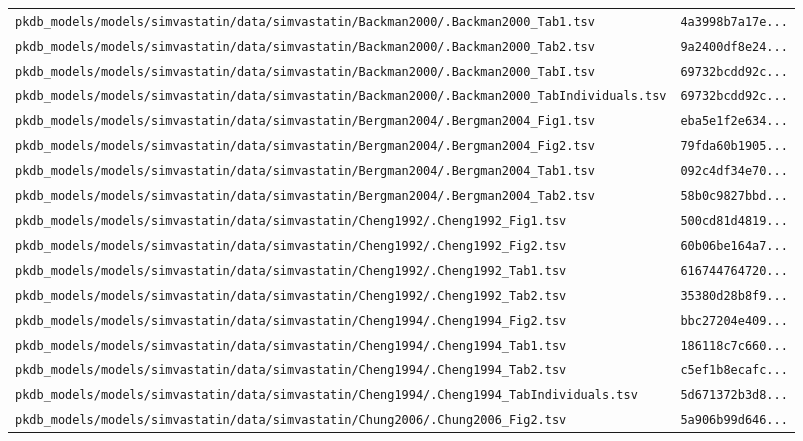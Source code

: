 \begin{longtable}{ll}
\texttt{pkdb\_models/models/simvastatin/data/simvastatin/Backman2000/.Backman2000\_Tab1.tsv} & \texttt{4a3998b7a17e...} \\
\texttt{pkdb\_models/models/simvastatin/data/simvastatin/Backman2000/.Backman2000\_Tab2.tsv} & \texttt{9a2400df8e24...} \\
\texttt{pkdb\_models/models/simvastatin/data/simvastatin/Backman2000/.Backman2000\_TabI.tsv} & \texttt{69732bcdd92c...} \\
\texttt{pkdb\_models/models/simvastatin/data/simvastatin/Backman2000/.Backman2000\_TabIndividuals.tsv} & \texttt{69732bcdd92c...} \\
\texttt{pkdb\_models/models/simvastatin/data/simvastatin/Bergman2004/.Bergman2004\_Fig1.tsv} & \texttt{eba5e1f2e634...} \\
\texttt{pkdb\_models/models/simvastatin/data/simvastatin/Bergman2004/.Bergman2004\_Fig2.tsv} & \texttt{79fda60b1905...} \\
\texttt{pkdb\_models/models/simvastatin/data/simvastatin/Bergman2004/.Bergman2004\_Tab1.tsv} & \texttt{092c4df34e70...} \\
\texttt{pkdb\_models/models/simvastatin/data/simvastatin/Bergman2004/.Bergman2004\_Tab2.tsv} & \texttt{58b0c9827bbd...} \\
\texttt{pkdb\_models/models/simvastatin/data/simvastatin/Cheng1992/.Cheng1992\_Fig1.tsv} & \texttt{500cd81d4819...} \\
\texttt{pkdb\_models/models/simvastatin/data/simvastatin/Cheng1992/.Cheng1992\_Fig2.tsv} & \texttt{60b06be164a7...} \\
\texttt{pkdb\_models/models/simvastatin/data/simvastatin/Cheng1992/.Cheng1992\_Tab1.tsv} & \texttt{616744764720...} \\
\texttt{pkdb\_models/models/simvastatin/data/simvastatin/Cheng1992/.Cheng1992\_Tab2.tsv} & \texttt{35380d28b8f9...} \\
\texttt{pkdb\_models/models/simvastatin/data/simvastatin/Cheng1994/.Cheng1994\_Fig2.tsv} & \texttt{bbc27204e409...} \\
\texttt{pkdb\_models/models/simvastatin/data/simvastatin/Cheng1994/.Cheng1994\_Tab1.tsv} & \texttt{186118c7c660...} \\
\texttt{pkdb\_models/models/simvastatin/data/simvastatin/Cheng1994/.Cheng1994\_Tab2.tsv} & \texttt{c5ef1b8ecafc...} \\
\texttt{pkdb\_models/models/simvastatin/data/simvastatin/Cheng1994/.Cheng1994\_TabIndividuals.tsv} & \texttt{5d671372b3d8...} \\
\texttt{pkdb\_models/models/simvastatin/data/simvastatin/Chung2006/.Chung2006\_Fig2.tsv} & \texttt{5a906b99d646...} \\

\end{longtable}
